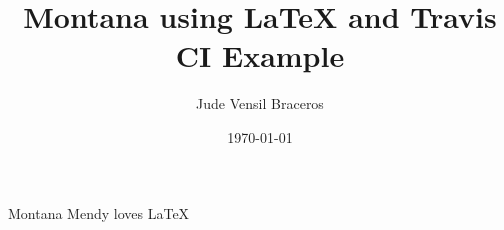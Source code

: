 \documentclass{article}
\title{Montana using LaTeX and Travis CI Example}
\author{Jude Vensil Braceros}
\date{\today}
\begin{document}
\maketitle

Montana Mendy loves LaTeX 
\end{document}
